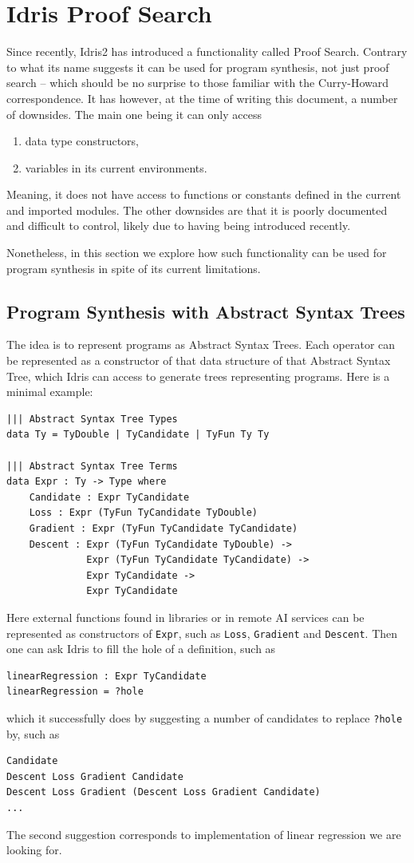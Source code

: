 \documentclass[]{report}
\begin{document}
\section{Idris Proof Search}
Since recently, Idris2 has introduced a functionality called Proof
Search.  Contrary to what its name suggests it can be used for program
synthesis, not just proof search -- which should be no surprise to
those familiar with the Curry-Howard correspondence.  It has however,
at the time of writing this document, a number of downsides.  The main
one being it can only access
\begin{enumerate}
\item data type constructors,
\item variables in its current environments.
\end{enumerate}
Meaning, it does not have access to functions or constants defined in
the current and imported modules.  The other downsides are that it is
poorly documented and difficult to control, likely due to having being
introduced recently.

Nonetheless, in this section we explore how such functionality can be
used for program synthesis in spite of its current limitations.

\subsection{Program Synthesis with Abstract Syntax Trees}
\label{subsec:AST}
The idea is to represent programs as Abstract Syntax Trees.  Each
operator can be represented as a constructor of that data structure of
that Abstract Syntax Tree, which Idris can access to generate trees
representing programs.  Here is a minimal example:
\begin{verbatim}
||| Abstract Syntax Tree Types
data Ty = TyDouble | TyCandidate | TyFun Ty Ty

||| Abstract Syntax Tree Terms
data Expr : Ty -> Type where
    Candidate : Expr TyCandidate
    Loss : Expr (TyFun TyCandidate TyDouble)
    Gradient : Expr (TyFun TyCandidate TyCandidate)
    Descent : Expr (TyFun TyCandidate TyDouble) ->
              Expr (TyFun TyCandidate TyCandidate) ->
              Expr TyCandidate ->
              Expr TyCandidate
\end{verbatim}
Here external functions found in libraries or in remote AI services
can be represented as constructors of \texttt{Expr}, such as
\texttt{Loss}, \texttt{Gradient} and \texttt{Descent}.  Then one can
ask Idris to fill the hole of a definition, such as
\begin{verbatim}
linearRegression : Expr TyCandidate
linearRegression = ?hole
\end{verbatim}
which it successfully does by suggesting a number of candidates to
replace \texttt{?hole} by, such as
\begin{verbatim}
Candidate
Descent Loss Gradient Candidate
Descent Loss Gradient (Descent Loss Gradient Candidate)
...
\end{verbatim}
The second suggestion corresponds to implementation of linear
regression we are looking for.
\end{document}
